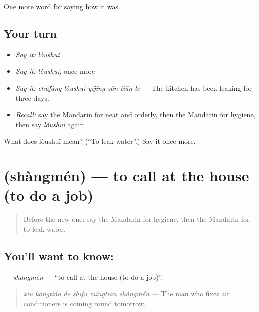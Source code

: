 \begin{grammarlens}[title={What you've built}]
One more word for saying how it was.
\end{grammarlens}

\subsection*{Your turn}
\begin{itemize}
\raggedright
  \item \emph{Say it:} \emph{lòushuǐ}
  \item \emph{Say it:} \emph{lòushuǐ}, once more
  \item \emph{Say it:} \emph{chúfáng lòushuǐ yǐjīng sān tiān le} — The kitchen has been leaking for three days.
  \item \emph{Recall:} say the Mandarin for neat and orderly, then the Mandarin for hygiene, then say \emph{lòushuǐ} again
\end{itemize}

\begin{tcolorbox}[breakable,colback=teal!4,colframe=teal!35!black,title={Before you move on}]
What does lòushuǐ mean? (\textquotedblleft{}To leak water\textquotedblright{}.) Say it once more.
\end{tcolorbox}
\section[\texorpdfstring{\zh{上门} (shàngmén)}{上门 (shàngmén)}]{ (shàngmén) — to call at the house (to do a job)}

\label{lesson:ZH-C522-shangmen}



\begin{quote}
Before the new one: say the Mandarin for hygiene, then the Mandarin for to leak water.
\end{quote}

\subsection*{You'll want to know: }
\textbf{} — \emph{shàngmén} — \textquotedblleft{}to call at the house (to do a job)\textquotedblright{}.

\begin{quote}
\emph{xiū kōngtiáo de shīfu míngtiān shàngmén} — The man who fixes air conditioners is coming round tomorrow.
\end{quote}

